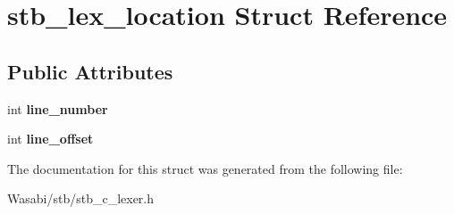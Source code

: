 \hypertarget{structstb__lex__location}{}\section{stb\+\_\+lex\+\_\+location Struct Reference}
\label{structstb__lex__location}
\subsection*{Public Attributes}
\begin{DoxyCompactItemize}
\item 
int {\bfseries line\+\_\+number}\hypertarget{structstb__lex__location_abb16a96f4418f8823a5a3aa63547e1e1}{}\label{structstb__lex__location_abb16a96f4418f8823a5a3aa63547e1e1}

\item 
int {\bfseries line\+\_\+offset}\hypertarget{structstb__lex__location_a868620c2d123928b8b77e2de57ce0c29}{}\label{structstb__lex__location_a868620c2d123928b8b77e2de57ce0c29}

\end{DoxyCompactItemize}


The documentation for this struct was generated from the following file\+:\begin{DoxyCompactItemize}
\item 
Wasabi/stb/stb\+\_\+c\+\_\+lexer.\+h\end{DoxyCompactItemize}
